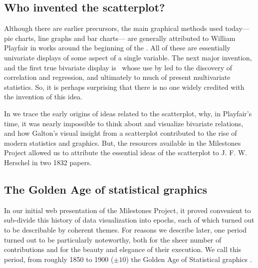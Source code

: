 \subsection{Who invented the scatterplot?}
Although there are earlier precursors, the main graphical methods used today---
pie charts, line graphs and bar charts--- are generally attributed to
William Playfair in works around the beginning of the 
\citep{Playfair:1786,Playfair:1801}. All of these are essentially univariate
displays of some aspect of a single variable. The next major invention,
and the first true bivariate display is \scat\, whose use by
\citet{Galton:1886} led to the discovery of
correlation and regression, and ultimately to much of present multivariate
statistics. So, it is perhaps surprising that there is no one widely
credited with the invention of this idea.

In \citet{FriendlyDenis:05:scat} we trace the early origins of ideas related to
the scatterplot, why, in Playfair's time, it was nearly impossible to think about
and visualize bivariate relations, and how Galton's visual insight from
a scatterplot contributed to the rise of modern statistics and graphics.
But, the resources available in the Milestones Project allowed us to attribute
the essential ideas of the scatterplot to J. F. W. Herschel in two 1832 papers.

\subsection{The Golden Age of statistical graphics}

In our initial web presentation of the Milestones Project, it proved convenient
to sub-divide this history of data visualization into epochs, each of which turned
out to be describable by coherent themes.  For reasons we describe later, one
period turned out to be particularly noteworthy, both for the sheer number of
contributions and for the beauty and elegance of their execution.
We call this period, from roughly 1850 to 1900 ($\pm 10$) the Golden Age of
Statistical graphics \citep{Friendly:2008:golden}.

